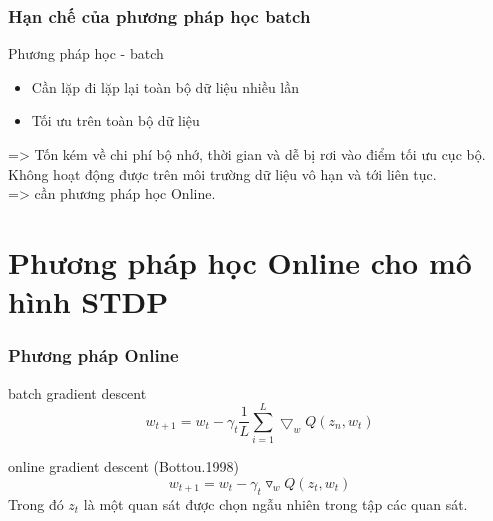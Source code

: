 \documentclass{beamer}
\begin{document}

\begin{frame}
\frametitle{Hạn chế của phương pháp học batch}

 \begin{block}{Phương pháp học - batch}
 \begin{itemize}
 	\item Cần lặp đi lặp lại toàn bộ dữ liệu nhiều lần
 	\item Tối ưu trên toàn bộ dữ liệu
\end{itemize}
\end{block}
=> Tốn kém về chi phí bộ nhớ, thời gian và dễ bị rơi vào điểm tối ưu cục bộ.\\      Không hoạt động được trên môi trường dữ liệu vô hạn và tới liên tục.\\
=> cần phương pháp học Online.
\end{frame}


\section{Phương pháp học Online cho mô hình STDP}

\begin{frame}
\frametitle{Phương pháp Online}
\begin{block}{batch gradient descent}
\begin{equation}
w_{t+1} = w_t -\gamma_t\frac{1}{L}\sum_{i=1}^{L}\bigtriangledown_wQ(z_n,w_t)
\end{equation}
\end{block}
\begin{block}{online gradient descent (Bottou.1998)}
\begin{equation}
w_{t+1} = w_t - \gamma_t \triangledown_w Q(z_t,w_t)
\end{equation}
Trong đó $z_t$ là một quan sát được chọn ngẫu nhiên trong tập các quan sát.
\end{block}
\end{frame}
\end{document}
